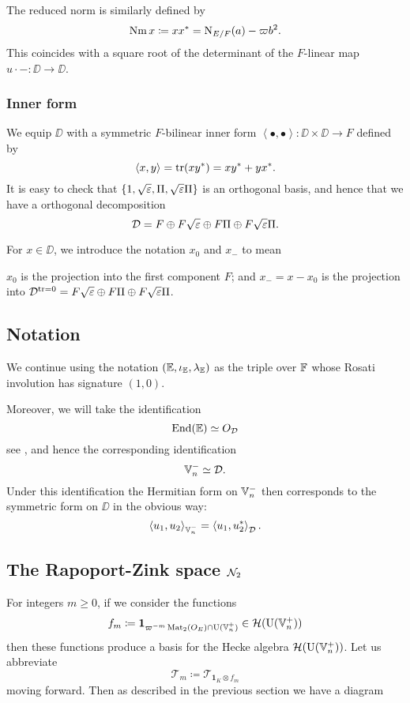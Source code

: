 The reduced norm is similarly defined by
\[ \operatorname{Nm} x \coloneqq x x^\ast = \operatorname{N}_{E/F}(a) - \varpi b^2. \]
This coincides with a square root of
the determinant of the $F$-linear map $u \cdot - \colon \DD \to \DD$.

\subsubsection{Inner form}
We equip $\DD$ with a symmetric $F$-bilinear inner form
$\left\langle \bullet, \bullet \right\rangle \colon \DD \times \DD \to F$ defined by
\[ \left\langle x,y \right\rangle = \operatorname{tr}(xy^\ast) = xy^\ast + yx^\ast. \]
It is easy to check that $\{1, \sqrt{\varepsilon}, \Pi, \sqrt{\varepsilon}\Pi\}$ is an orthogonal basis,
and hence that we have a orthogonal decomposition
\[ \mathcal D = F \oplus F\sqrt{\varepsilon} \oplus F \Pi \oplus F\sqrt{\varepsilon}\Pi. \]

For $x \in \DD$, we introduce the notation $x_0$ and $x_-$ to mean
\begin{itemize}
  \ii $x_0$ is the projection into the first component $F$; and
  \ii $x_- = x - x_0$ is the projection into
  $\mathcal D^{\operatorname{tr} = 0} = F\sqrt{\varepsilon} \oplus F \Pi \oplus F\sqrt{\varepsilon}\Pi$.
\end{itemize}

\subsection{Notation}
We continue using the notation $(\mathbb E, \iota_\mathbb E, \lambda_\mathbb E)$ as the triple over $\mathbb F$
whose Rosati involution has signature $(1,0)$.

Moreover, we will take the identification
\[ \operatorname{End}(\mathbb E) \simeq O_\mathcal D \]
see \cite[Remark 2.5]{ref:KR},
and hence the corresponding identification
\[ \mathbb V_n^- \simeq \mathcal D. \]
Under this identification
the Hermitian form on $\mathbb V_n^-$ then corresponds to the
symmetric form on $\DD$ in the obvious way:
\[ \left\langle u_1, u_2 \right\rangle_{\mathbb V_n^-}
  = \left\langle u_1, u_2^\ast \right\rangle_{\mathcal D}. \]

\subsection{The Rapoport-Zink space $\mathcal N_2$}
For integers $m \ge 0$, if we consider the functions
\[ f_m \coloneqq \mathbf{1}_{\varpi^{-m} \operatorname{Mat}_2(O_E) \cap \operatorname{U}(\mathbb V_n^+)} \in \mathcal H(\operatorname{U}(\mathbb V_n^+)) \]
then these functions produce a basis for the Hecke algebra $\mathcal H(\operatorname{U}(\mathbb V_n^+))$.
Let us abbreviate
\[ \mathcal{T}_m \coloneqq \mathcal{T}_{\mathbf{1}_K \otimes f_m} \]
moving forward.
Then as described in the previous section we have a diagram
\begin{center}
\end{center}

